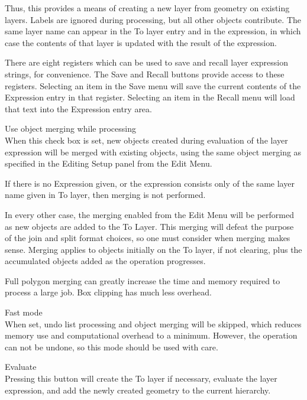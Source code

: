 \begin{description}
Thus, this provides a means of creating a new layer from geometry on
existing layers.  Labels are ignored during processing, but all other
objects contribute.  The same layer name can appear in the {\cb To
layer} entry and in the expression, in which case the contents of that
layer is updated with the result of the expression.

There are eight registers which can be used to save and recall layer
expression strings, for convenience.  The {\cb Save} and {\cb Recall}
buttons provide access to these registers.  Selecting an item in the
{\cb Save} menu will save the current contents of the {\cb Expression}
entry in that register.  Selecting an item in the {\cb Recall} menu
will load that text into the {\cb Expression} entry area.

\item{\cb Use object merging while processing}\\
When this check box is set, new objects created during evaluation of
the layer expression will be merged with existing objects, using the
same object merging as specified in the {\cb Editing Setup} panel from
the {\cb Edit Menu}.

If there is no {\cb Expression} given, or the expression consists only
of the same layer name given in {\cb To layer}, then merging is not
performed.

In every other case, the merging enabled from the {\cb Edit Menu} will
be performed as new objects are added to the {\cb To Layer}.  This
merging will defeat the purpose of the join and split format choices,
so one must consider when merging makes sense.  Merging applies to
objects initially on the {\cb To layer}, if not clearing, plus the
accumulated objects added as the operation progresses.

Full polygon merging can greatly increase the time and memory required
to process a large job.  Box clipping has much less overhead.

\item{\cb Fast mode}\\
When set, undo list processing and object merging will be skipped,
which reduces memory use and computational overhead to a minimum. 
However, the operation can not be undone, so this mode should be used
with care.

\item{\cb Evaluate}\\
Pressing this button will create the {\cb To layer} if necessary,
evaluate the layer expression, and add the newly created geometry to
the current hierarchy.
\end{description}

